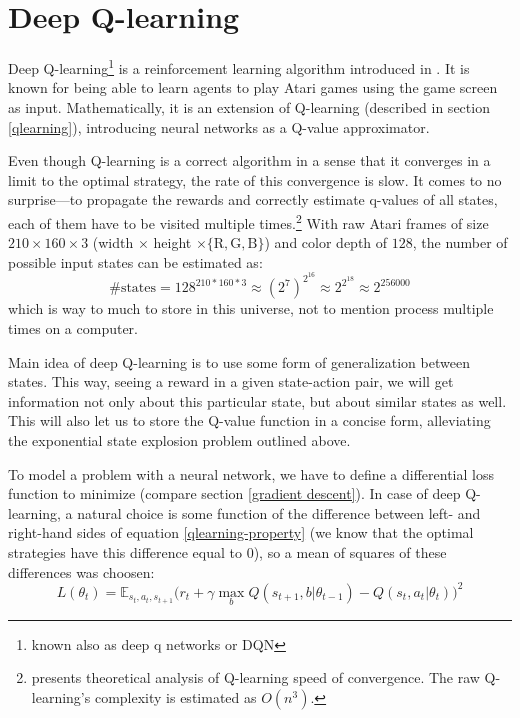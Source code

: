 \chapter{Deep Q-learning}\label{dqn}
Deep Q-learning\footnote{known also as deep q networks or DQN} is a reinforcement learning algorithm introduced in \cite{nips-dqn}. It is known for being able to learn agents to play Atari games using the game screen as input. Mathematically, it is an extension of Q-learning (described in section \ref{qlearning}), introducing neural networks as a Q-value approximator.

Even though Q-learning is a correct algorithm in a sense that it converges in a limit to the optimal strategy, the rate of this convergence is slow. It comes to no surprise---to propagate the rewards and correctly estimate q-values of all states, each of them have to be visited multiple times.\footnote{\cite{qlearning-complexity} presents theoretical analysis of Q-learning speed of convergence. The raw Q-learning's complexity is estimated as $O(n^3)$.}
With raw Atari frames of size $210 \times 160 \times 3$ (width $\times$ height $\times \{\text{R}, \text{G}, \text{B}\}$) and color depth of $128$, the number of possible input states can be estimated as:
\begin{equation}
  \mbox{\# states} = 128^{210*160*3} \approx (2^7)^{2^{16}} \approx 2^{2^{18}} \approx 2^{256000}
\end{equation}\label{number-frame-states}
which is way to much to store in this universe, not to mention process multiple times on a computer.

Main idea of deep Q-learning is to use some form of generalization between states. This way, seeing a reward in a given state-action pair, we will get information not only about this particular state, but about similar states as well. This will also let us to store the Q-value function in a concise form, alleviating the exponential state explosion problem outlined above.

To model a problem with a neural network, we have to define a differential loss function to minimize (compare section \ref{gradient descent}). In case of deep Q-learning, a natural choice is some function of the difference between left- and right-hand sides of equation \eqref{qlearning-property} (we know that the optimal strategies have this difference equal to $0$), so a mean of squares of these differences was choosen:
\begin{equation}\label{dqn-loss}
  L(\theta_t) = \mathbb{E}_{s_t, a_t, s_{t+1}} \big(r_t + \gamma \max_b Q(s_{t+1}, b|\theta_{t-1}) - Q(s_t, a_t|\theta_t)\big)^2
\end{equation}

